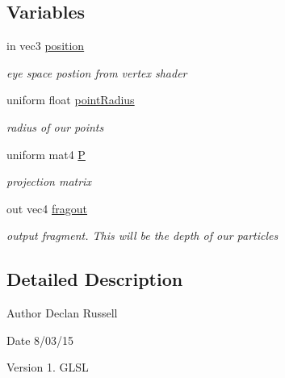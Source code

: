 \subsection*{Variables}
\begin{DoxyCompactItemize}
\item 
\hypertarget{particle_depth_frag_8glsl_a3ed508f736330bc856fb21ef562c1963}{in vec3 \hyperlink{particle_depth_frag_8glsl_a3ed508f736330bc856fb21ef562c1963}{position}}\label{particle_depth_frag_8glsl_a3ed508f736330bc856fb21ef562c1963}

\begin{DoxyCompactList}\small\item\em eye space postion from vertex shader \end{DoxyCompactList}\item 
\hypertarget{particle_depth_frag_8glsl_a59376561fcb9ace7e6531ad800fb1283}{uniform float \hyperlink{particle_depth_frag_8glsl_a59376561fcb9ace7e6531ad800fb1283}{point\-Radius}}\label{particle_depth_frag_8glsl_a59376561fcb9ace7e6531ad800fb1283}

\begin{DoxyCompactList}\small\item\em radius of our points \end{DoxyCompactList}\item 
\hypertarget{particle_depth_frag_8glsl_a06f273d5c491bfbe3897fc9c73dcf0d5}{uniform mat4 \hyperlink{particle_depth_frag_8glsl_a06f273d5c491bfbe3897fc9c73dcf0d5}{P}}\label{particle_depth_frag_8glsl_a06f273d5c491bfbe3897fc9c73dcf0d5}

\begin{DoxyCompactList}\small\item\em projection matrix \end{DoxyCompactList}\item 
\hypertarget{particle_depth_frag_8glsl_a575f888600764d6ebd67a3fd89a7d034}{out vec4 \hyperlink{particle_depth_frag_8glsl_a575f888600764d6ebd67a3fd89a7d034}{fragout}}\label{particle_depth_frag_8glsl_a575f888600764d6ebd67a3fd89a7d034}

\begin{DoxyCompactList}\small\item\em output fragment. This will be the depth of our particles \end{DoxyCompactList}\end{DoxyCompactItemize}


\subsection{Detailed Description}
\begin{DoxyAuthor}{Author}
Declan Russell 
\end{DoxyAuthor}
\begin{DoxyDate}{Date}
8/03/15 
\end{DoxyDate}
\begin{DoxyVersion}{Version}
1.  G\-L\-S\-L 
\end{DoxyVersion}
